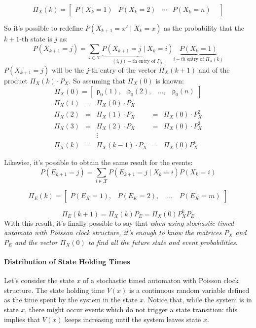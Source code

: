 \documentclass[12pt,a4paper]{article}
\newcommand*{\transp}{\mathsf{p}}
\begin{document}
\bigskip
$$
\Pi_X(k)=
\left[
\begin{matrix}
P(X_k=1)&
P(X_k=2)&
\cdots&
P(X_k=n)&
\end{matrix}
\right]
$$

\bigskip
\noindent
So it's possible to redefine $P(X_{k+1} = x' \mid X_k = x)$ as the probability that the $k+1$-th state is $j$ as:
$$
P\left(X_{k+1}=j\right)=\sum_{i\in \mathcal{X}}
{
\underbrace{P\left(X_{k+1}=j  \mid  X_k=i\right)}_{(i,j)-\text{th}\text{ entry of }P_X}
\underbrace{P\left(X_k=1\right)}_{i-th\text{ entry of }\Pi_X(k)}
}
$$ 
$P(X_{k+1} = j)$ will be the $j$-th entry of the vector $\Pi_X(k+1)$ and of the product $\Pi_X(k) \cdot P_X$. 
\newpage
\noindent
So assuming that $\Pi_X(0)$ is known:
$$
\Pi_X(0)=
\left[
\begin{matrix}
\transp_0(1),&
\transp_0(2),&
\dots,&
\transp_0(n)
\end{matrix}
\right]
$$
$$
\begin{matrix}
\Pi_X(1)&=&\Pi_X(0) \cdot P_X\\
\Pi_X(2)&=&\Pi_X(1) \cdot P_X&=&\Pi_X(0) \cdot P_X^2\\
\Pi_X(3)&=&\Pi_X(2) \cdot P_X&=&\Pi_X(0) \cdot P_X^3\\
&&\vdots\\
\Pi_X(k)&=&\Pi_X(k-1) \cdot P_X&=&\Pi_X(0)P_X^k
\end{matrix}
$$

\bigskip
\noindent
Likewise, it's possible to obtain the same result for the events: 
$$
P\left(E_{k+1}=j\right)=\sum_{i\in\mathcal{X}}{P\left(E_{k+1}=j \mid X_k=i\right)P\left(X_k=i\right)}
$$

$$
\Pi_E(k)=
\left[
\begin{matrix}
P\left(E_K=1\right),&
P\left(E_K=2\right),&
\dots,&
P\left(E_K=m\right)
\end{matrix}
\right]
$$

$$
\Pi_E(k+1)=\Pi_X(k)P_E=\Pi_X(0)P_X^kP_E
$$
With this result, it's finally possible to say that \emph{when using stochastic timed automata with Poisson clock structure, it's enough to know the matrices $P_X$ and $P_E$ and the vector $\Pi_X(0)$ to find all the future state and event probabilities}. 
\paragraph{Distribution of State Holding Times} Let's consider the state $x$ of a stochastic timed automaton with Poisson clock structure. The state holding time $V(x)$ is a continuous random variable defined as the time spent by the system in the state $x$. Notice that, while the system is in state $x$, there might occur events which do not trigger a state transition: this implies that $V(x)$ keeps increasing until the system leaves state $x$.
\end{document}
